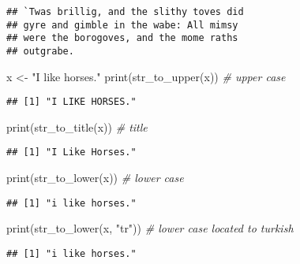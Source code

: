 \documentclass[
]{article}
\newenvironment{Shaded}{\begin{snugshade}}{\end{snugshade}}
\newcommand{\CommentTok}[1]{\textcolor[rgb]{0.56,0.35,0.01}{\textit{#1}}}
\newcommand{\FunctionTok}[1]{\textcolor[rgb]{0.00,0.00,0.00}{#1}}
\newcommand{\NormalTok}[1]{#1}
\newcommand{\OtherTok}[1]{\textcolor[rgb]{0.56,0.35,0.01}{#1}}
\newcommand{\StringTok}[1]{\textcolor[rgb]{0.31,0.60,0.02}{#1}}
\begin{document}
\begin{verbatim}
## `Twas brillig, and the slithy toves did
## gyre and gimble in the wabe: All mimsy
## were the borogoves, and the mome raths
## outgrabe.
\end{verbatim}

\begin{Shaded}
\begin{Highlighting}[]
\NormalTok{x }\OtherTok{\textless{}{-}} \StringTok{"I like horses."}
\FunctionTok{print}\NormalTok{(}\FunctionTok{str\_to\_upper}\NormalTok{(x)) }\CommentTok{\# upper case}
\end{Highlighting}
\end{Shaded}

\begin{verbatim}
## [1] "I LIKE HORSES."
\end{verbatim}

\begin{Shaded}
\begin{Highlighting}[]
\FunctionTok{print}\NormalTok{(}\FunctionTok{str\_to\_title}\NormalTok{(x)) }\CommentTok{\# title}
\end{Highlighting}
\end{Shaded}

\begin{verbatim}
## [1] "I Like Horses."
\end{verbatim}

\begin{Shaded}
\begin{Highlighting}[]
\FunctionTok{print}\NormalTok{(}\FunctionTok{str\_to\_lower}\NormalTok{(x)) }\CommentTok{\# lower case}
\end{Highlighting}
\end{Shaded}

\begin{verbatim}
## [1] "i like horses."
\end{verbatim}

\begin{Shaded}
\begin{Highlighting}[]
\FunctionTok{print}\NormalTok{(}\FunctionTok{str\_to\_lower}\NormalTok{(x, }\StringTok{"tr"}\NormalTok{)) }\CommentTok{\# lower case located to turkish}
\end{Highlighting}
\end{Shaded}

\begin{verbatim}
## [1] "i like horses."
\end{verbatim}
\end{document}
